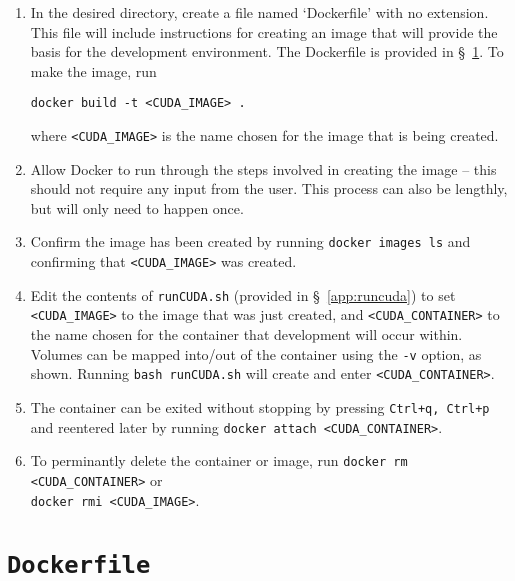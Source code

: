 \documentclass[11pt,letterpaper]{article}
\begin{document}
\begin{enumerate}
  \item In the desired directory, create a file named `Dockerfile' with no extension. This file
  will include instructions for creating an image that will provide the basis for the development
  environment. The Dockerfile is provided in \S~\!\ref{app:dockerfile}. To make the image, run
  \begin{center}
    \verb+docker build -t <CUDA_IMAGE> .+
  \end{center}
  where \verb+<CUDA_IMAGE>+ is the name chosen for the image that is being created.
  \item Allow Docker to run through the steps involved in creating the image -- this should not require
  any input from the user. This process can also be lengthly, but will only need to happen once.
  \item Confirm the image has been created by running \verb+docker images ls+ and confirming that
  \verb+<CUDA_IMAGE>+ was created. 
  \item Edit the contents of \texttt{runCUDA.sh} (provided in \S~\!\ref{app:runcuda}) to set \verb+<CUDA_IMAGE>+ to the image that
  was just created, and \verb+<CUDA_CONTAINER>+ to the name chosen for the container that development
  will occur within. Volumes can be mapped into/out of the container using the \texttt{-v} option, as shown. Running 
  \texttt{bash runCUDA.sh} will create and enter \verb+<CUDA_CONTAINER>+.
  \item The container can be exited without stopping by pressing \texttt{Ctrl+q, Ctrl+p} and reentered 
  later by running \verb+docker attach <CUDA_CONTAINER>+.
  \item To perminantly delete the container or image, run \verb+docker rm <CUDA_CONTAINER>+
  or \\\verb+docker rmi <CUDA_IMAGE>+.
\end{enumerate}




\section{\texttt{Dockerfile}}
\label{app:dockerfile}
\end{document}

